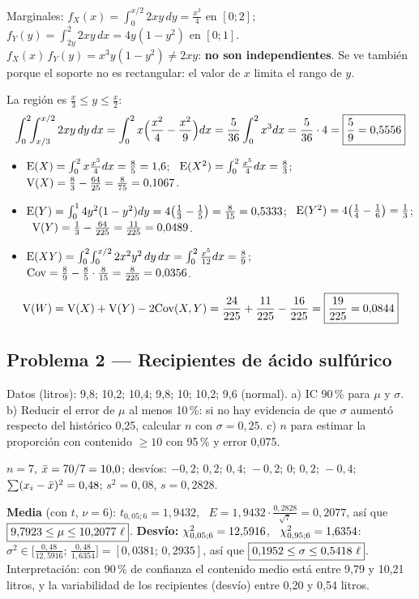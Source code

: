 Marginales: $f_X(x)=\int_0^{x/2}2xy\,dy=\frac{x^3}{4}$ en $[0;2]$; \ $f_Y(y)=\int_{2y}^{2}2xy\,dx=4y(1-y^2)$ en $[0;1]$.
$f_X(x)\,f_Y(y)=x^3y(1-y^2)\neq2xy$: \textbf{no son independientes}. Se ve también porque el soporte no es rectangular: el valor de $x$ limita el rango de $y$.

La región es $\frac x3\le y\le\frac x2$:
\[
\int_0^2\!\!\int_{x/3}^{x/2}2xy\,dy\,dx=\int_0^2x\Big(\frac{x^2}{4}-\frac{x^2}{9}\Big)dx=\frac{5}{36}\int_0^2x^3dx=\frac5{36}\cdot4=\boxed{\frac59=0{,}5556}
\]
\begin{itemize}
\item $\mathrm{E}(X)=\int_0^2x\frac{x^3}{4}dx=\frac{8}{5}=1{,}6$; \ $\mathrm{E}(X^2)=\int_0^2\frac{x^5}{4}dx=\frac83$; \ $\mathrm{V}(X)=\frac83-\frac{64}{25}=\frac{8}{75}=0{,}1067$.
\item $\mathrm{E}(Y)=\int_0^14y^2(1-y^2)dy=4\big(\frac13-\frac15\big)=\frac8{15}=0{,}5333$; \ $\mathrm{E}(Y^2)=4\big(\frac14-\frac16\big)=\frac13$; \ $\mathrm{V}(Y)=\frac13-\frac{64}{225}=\frac{11}{225}=0{,}0489$.
\item $\mathrm{E}(XY)=\int_0^2\!\int_0^{x/2}2x^2y^2\,dy\,dx=\int_0^2\frac{x^5}{12}dx=\frac89$; \ $\mathrm{Cov}=\frac89-\frac85\cdot\frac8{15}=\frac{8}{225}=0{,}0356$.
\end{itemize}
\[
\mathrm{V}(W)=\mathrm{V}(X)+\mathrm{V}(Y)-2\mathrm{Cov}(X,Y)=\frac{24}{225}+\frac{11}{225}-\frac{16}{225}=\boxed{\frac{19}{225}=0{,}0844}
\]

\subsection{Problema 2 --- Recipientes de ácido sulfúrico}
\begin{enun}
Datos (litros): 9,8; 10,2; 10,4; 9,8; 10; 10,2; 9,6 (normal). a) IC 90\,\% para $\mu$ y $\sigma$. b) Reducir el error de $\mu$ al menos 10\,\%: si no hay evidencia de que $\sigma$ aumentó respecto del histórico 0,25, calcular $n$ con $\sigma=0{,}25$. c) $n$ para estimar la proporción con contenido $\ge10$ con 95\,\% y error 0,075.
\end{enun}
 $n=7$, $\bar{x}=70/7=10{,}0$; desvíos: $-0{,}2;\,0{,}2;\,0{,}4;\,-0{,}2;\,0;\,0{,}2;\,-0{,}4$; $\sum(x_i-\bar{x})^2=0{,}48$; $s^2=0{,}08$, $s=0{,}2828$.

\textbf{Media} (con $t$, $\nu=6$): $t_{0,05;6}=1{,}9432$, \ $E=1{,}9432\cdot\frac{0{,}2828}{\sqrt7}=0{,}2077$, así que $\res{9{,}7923\le\mu\le10{,}2077\ \ell}$.
\textbf{Desvío:} $\chi^2_{0,05;6}=12{,}5916$, \ $\chi^2_{0,95;6}=1{,}6354$:
$\sigma^2\in\big[\frac{0{,}48}{12{,}5916};\,\frac{0{,}48}{1{,}6354}\big]=[0{,}0381;\,0{,}2935]$, así que $\res{0{,}1952\le\sigma\le0{,}5418\ \ell}$.
Interpretación: con 90\,\% de confianza el contenido medio está entre 9,79 y 10,21 litros, y la variabilidad de los recipientes (desvío) entre 0,20 y 0,54 litros.

